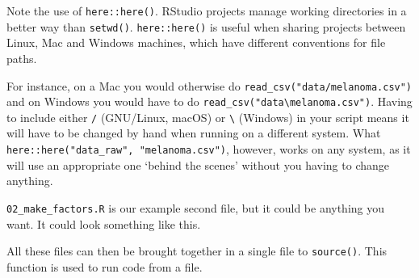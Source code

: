 \documentclass[
  12pt,
  krantz2]{krantz}
\makeatletter
\newenvironment{Shaded}{\begin{snugshade}}{\end{snugshade}}
\newcommand{\CommentTok}[1]{\textcolor[rgb]{0.56,0.35,0.01}{\textit{#1}}}
\newcommand{\DataTypeTok}[1]{\textcolor[rgb]{0.13,0.29,0.53}{#1}}
\newcommand{\KeywordTok}[1]{\textcolor[rgb]{0.13,0.29,0.53}{\textbf{#1}}}
\newcommand{\NormalTok}[1]{#1}
\newcommand{\OperatorTok}[1]{\textcolor[rgb]{0.81,0.36,0.00}{\textbf{#1}}}
\newcommand{\StringTok}[1]{\textcolor[rgb]{0.31,0.60,0.02}{#1}}
\newenvironment{kframe}{%
\medskip{}
\setlength{\fboxsep}{.8em}
 \def\at@end@of@kframe{}%
 \ifinner\ifhmode%
  \def\at@end@of@kframe{\end{minipage}}%
  \begin{minipage}{\columnwidth}%
 \fi\fi%
 \def\FrameCommand##1{\hskip\@totalleftmargin \hskip-\fboxsep
 \colorbox{shadecolor}{##1}\hskip-\fboxsep
     \hskip-\linewidth \hskip-\@totalleftmargin \hskip\columnwidth}%
 \MakeFramed {\advance\hsize-\width
   \@totalleftmargin\z@ \linewidth\hsize
   \@setminipage}}%
 {\par\unskip\endMakeFramed%
 \at@end@of@kframe}
\renewenvironment{Shaded}{\begin{kframe}}{\end{kframe}}
\makeatother
\begin{document}
Note the use of \texttt{here::here()}.
RStudio projects manage working directories in a better way than \texttt{setwd()}.
\texttt{here::here()} is useful when sharing projects between Linux, Mac and Windows machines, which have different conventions for file paths.

For instance, on a Mac you would otherwise do \texttt{read\_csv("data/melanoma.csv")} and on Windows you would have to do \texttt{read\_csv("data\textbackslash{}melanoma.csv")}.
Having to include either \texttt{/} (GNU/Linux, macOS) or \texttt{\textbackslash{}} (Windows) in your script means it will have to be changed by hand when running on a different system.
What \texttt{here::here("data\_raw",\ "melanoma.csv")}, however, works on any system, as it will use an appropriate one `behind the scenes' without you having to change anything.

\texttt{02\_make\_factors.R} is our example second file, but it could be anything you want.
It could look something like this.

\begin{Shaded}
\end{Shaded}

All these files can then be brought together in a single file to \texttt{source()}.
This function is used to run code from a file.
\end{document}
